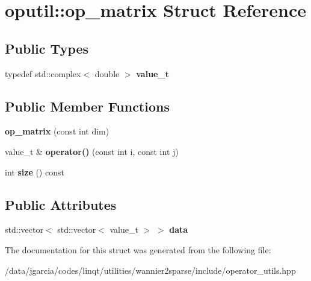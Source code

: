 \hypertarget{structoputil_1_1op__matrix}{}\section{oputil\+:\+:op\+\_\+matrix Struct Reference}
\label{structoputil_1_1op__matrix}
\subsection*{Public Types}
\begin{DoxyCompactItemize}
\item 
typedef std\+::complex$<$ double $>$ {\bfseries value\+\_\+t}\hypertarget{structoputil_1_1op__matrix_abab9d77ef16c61a8690416a8da709421}{}\label{structoputil_1_1op__matrix_abab9d77ef16c61a8690416a8da709421}

\end{DoxyCompactItemize}
\subsection*{Public Member Functions}
\begin{DoxyCompactItemize}
\item 
{\bfseries op\+\_\+matrix} (const int dim)\hypertarget{structoputil_1_1op__matrix_a92afbe3ef666e8d462b5a12058d4d34f}{}\label{structoputil_1_1op__matrix_a92afbe3ef666e8d462b5a12058d4d34f}

\item 
value\+\_\+t \& {\bfseries operator()} (const int i, const int j)\hypertarget{structoputil_1_1op__matrix_aa414c60df529f0a79c870de17b1699ff}{}\label{structoputil_1_1op__matrix_aa414c60df529f0a79c870de17b1699ff}

\item 
int {\bfseries size} () const \hypertarget{structoputil_1_1op__matrix_a15e6f331488f276a36606e329a0ab319}{}\label{structoputil_1_1op__matrix_a15e6f331488f276a36606e329a0ab319}

\end{DoxyCompactItemize}
\subsection*{Public Attributes}
\begin{DoxyCompactItemize}
\item 
std\+::vector$<$ std\+::vector$<$ value\+\_\+t $>$ $>$ {\bfseries data}\hypertarget{structoputil_1_1op__matrix_ac518c6275c8a0147c5688c5af57bca6f}{}\label{structoputil_1_1op__matrix_ac518c6275c8a0147c5688c5af57bca6f}

\end{DoxyCompactItemize}


The documentation for this struct was generated from the following file\+:\begin{DoxyCompactItemize}
\item 
/data/jgarcia/codes/linqt/utilities/wannier2sparse/include/operator\+\_\+utils.\+hpp\end{DoxyCompactItemize}
